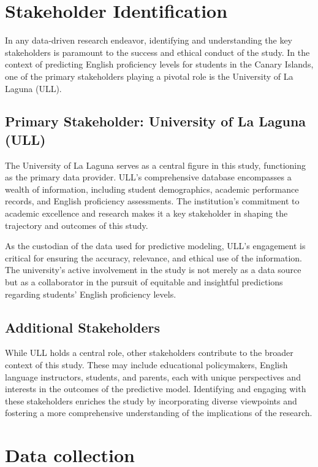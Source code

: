 \section{Stakeholder Identification}

In any data-driven research endeavor, identifying and understanding the key stakeholders is paramount to the success and ethical conduct of the study. In the context of predicting English proficiency levels for students in the Canary Islands, one of the primary stakeholders playing a pivotal role is the University of La Laguna (ULL).

\subsection{Primary Stakeholder: University of La Laguna (ULL)}

The University of La Laguna serves as a central figure in this study, functioning as the primary data provider. ULL's comprehensive database encompasses a wealth of information, including student demographics, academic performance records, and English proficiency assessments. The institution's commitment to academic excellence and research makes it a key stakeholder in shaping the trajectory and outcomes of this study.

As the custodian of the data used for predictive modeling, ULL's engagement is critical for ensuring the accuracy, relevance, and ethical use of the information. The university's active involvement in the study is not merely as a data source but as a collaborator in the pursuit of equitable and insightful predictions regarding students' English proficiency levels.

\subsection{Additional Stakeholders}

While ULL holds a central role, other stakeholders contribute to the broader context of this study. These may include educational policymakers, English language instructors, students, and parents, each with unique perspectives and interests in the outcomes of the predictive model. Identifying and engaging with these stakeholders enriches the study by incorporating diverse viewpoints and fostering a more comprehensive understanding of the implications of the research.

\section{Data collection}

